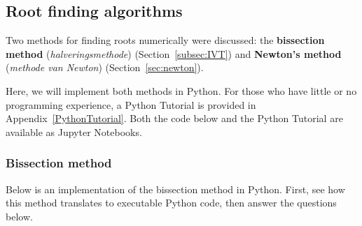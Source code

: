 \fi %

\ifcourse



\subsection{Root finding algorithms}\label{pc:nulpuntsbepaling}
Two methods for finding roots numerically were discussed: the \textbf{bissection method} (\textit{halveringsmethode}) (Section~\ref{subsec:IVT}) and \textbf{Newton's method} (\textit{methode van Newton}) (Section~\ref{sec:newton}).

Here, we will implement both methods in Python. For those who have little or no programming experience, a Python Tutorial is provided in Appendix~\ref{PythonTutorial}. Both the code below and the Python Tutorial are available as Jupyter Notebooks.

\subsubsection{Bissection method}\label{pc_halvering}
Below is an implementation of the bissection method in Python. First, see how this method translates to executable Python code, then answer the questions below.


